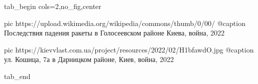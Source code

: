 \ifcmt
  tab_begin cols=2,no_fig,center

     pic https://upload.wikimedia.org/wikipedia/commons/thumb/0/00/%
     @caption Последствия падения ракеты в Голосеевском районе Киева, война, 2022
     
     pic https://kievvlast.com.ua/project/resources/2022/02/H1bfawdO.jpg
     @caption ул. Кошица, 7а в Дарницком районе, Киев, война, 2022

  tab_end
\fi
